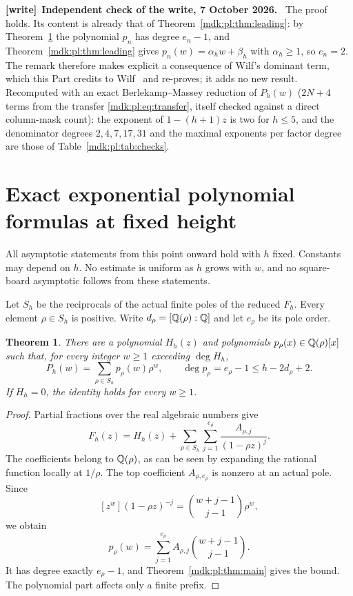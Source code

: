 \documentclass[11pt,letterpaper]{article}
\numberwithin{equation}{section}
\newtheorem{theorem}{Theorem}[section]
\theoremstyle{remark}\newtheorem{remark}[theorem]{Remark}
\newenvironment{writenote}[1][]{\par\smallskip\begingroup\small
 \noindent\textbf{[write]}\if\relax\detokenize{#1}\relax\else~\textbf{#1.}\fi\ }%
 {\par\endgroup\smallskip}
\begin{document}
\begin{writenote}[Independent check of the write, 7 October 2026]
The proof holds. Its content is already that of Theorem~\ref{mdk:pl:thm:leading}: by Theorem~\ref{mdk:pl:thm:exp-poly} the polynomial $p_{n}$ has degree $e_{n}-1$, and Theorem~\ref{mdk:pl:thm:leading} gives $p_n(w)=\alpha_hw+\beta_h$ with $\alpha_h\ge1$, so $e_n=2$. The remark therefore makes explicit a consequence of Wilf's dominant term, which this Part credits to Wilf~\cite{wilf} and re-proves; it adds no new result. Recomputed with an exact Berlekamp--Massey reduction of $P_h(w)$ ($2N+4$ terms from the transfer \eqref{mdk:pl:eq:transfer}, itself checked against a direct column-mask count): the exponent of $1-(h+1)z$ is two for $h\le5$, and the denominator degrees $2,4,7,17,31$ and the maximal exponents per factor degree are those of Table~\ref{mdk:pl:tab:checks}.
\end{writenote}

\section{Exact exponential polynomial formulas at fixed height}\label{mdk:pl:sec:exppoly}
All asymptotic statements from this point onward hold with $h$ fixed. Constants may depend on $h$. No estimate is uniform as $h$ grows with $w$, and no square-board asymptotic follows from these statements.

Let $S_h$ be the reciprocals of the actual finite poles of the reduced $F_h$. Every element $\rho\in S_h$ is positive. Write $d_\rho=[\mathbb Q(\rho):\mathbb Q]$ and let $e_\rho$ be its pole order.

\begin{theorem}\label{mdk:pl:thm:exp-poly}
There are a polynomial $H_h(z)$ and polynomials $p_\rho(x)\in\mathbb Q(\rho)[x]$ such that, for every integer $w\ge1$ exceeding $\deg H_h$,
\begin{equation}\label{mdk:pl:eq:exp-poly}
 P_h(w)=\sum_{\rho\in S_h}p_\rho(w)\rho^w,
 \qquad
 \deg p_\rho=e_\rho-1\le h-2d_\rho+2.
\end{equation}
If $H_h=0$, the identity holds for every $w\ge1$.
\end{theorem}
\begin{proof}
Partial fractions over the real algebraic numbers give
\begin{equation}\label{mdk:pl:eq:partialfractions}
 F_h(z)=H_h(z)+\sum_{\rho\in S_h}\sum_{j=1}^{e_\rho}
 \frac{A_{\rho,j}}{(1-\rho z)^j}.
\end{equation}
The coefficients belong to $\mathbb Q(\rho)$, as can be seen by expanding the rational function locally at $1/\rho$. The top coefficient $A_{\rho,e_\rho}$ is nonzero at an actual pole. Since
\[
 [z^w](1-\rho z)^{-j}=\binom{w+j-1}{j-1}\rho^w,
\]
we obtain
\begin{equation}\label{mdk:pl:eq:polynomialp}
 p_\rho(w)=\sum_{j=1}^{e_\rho}A_{\rho,j}\binom{w+j-1}{j-1}.
\end{equation}
It has degree exactly $e_\rho-1$, and Theorem~\ref{mdk:pl:thm:main} gives the bound. The polynomial part affects only a finite prefix.
\end{proof}
\end{document}
